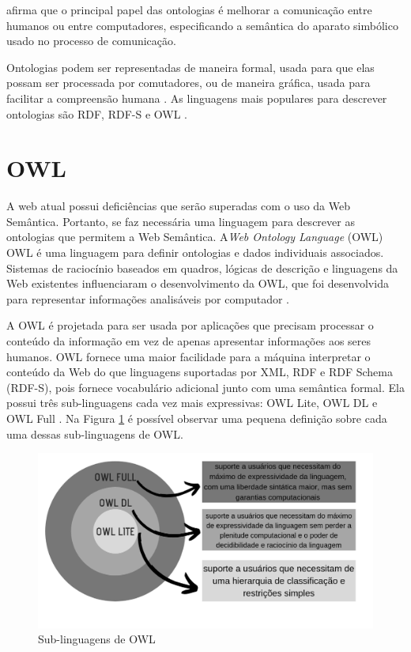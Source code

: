 \documentclass{bcc}
\begin{document}
\cite{lv2011} afirma que o principal papel das ontologias é melhorar a comunicação entre humanos ou entre computadores, especificando a semântica do aparato simbólico usado no processo de comunicação.

Ontologias podem ser representadas de maneira formal, usada para que elas possam ser processada por comutadores, ou de maneira gráfica, usada para facilitar a compreensão humana \cite{isotani2015}. As linguagens mais populares para descrever ontologias são RDF, RDF-S e OWL \cite{mcguinness}.


\section{OWL}

A web atual possui deficiências que serão superadas com o uso da Web Semântica. Portanto, se faz necessária uma linguagem para descrever as ontologias que permitem a Web Semântica. A\textit{Web Ontology Language} (OWL) OWL é uma linguagem para definir ontologias e dados individuais associados. Sistemas de raciocínio baseados em quadros, lógicas de descrição e linguagens da Web existentes influenciaram o desenvolvimento da OWL, que foi desenvolvida para representar informações analisáveis por computador \cite{lacy2005}.

A OWL é projetada para ser usada por aplicações que precisam processar o conteúdo da informação em vez de apenas apresentar informações aos seres humanos. OWL fornece uma maior facilidade para a máquina interpretar o conteúdo da Web do que linguagens suportadas por XML, RDF e RDF Schema (RDF-S), pois fornece vocabulário adicional junto com uma semântica formal. Ela possui três sub-linguagens cada vez mais expressivas: OWL Lite, OWL DL e OWL Full \cite{mcguinness}. Na Figura \ref{fig:owlsub} é possível observar uma pequena definição sobre cada uma dessas sub-linguagens de OWL.

\begin{figure}[H]
\centering
\includegraphics[width=.9\textwidth]{Figuras/owl_sub.png}
\caption{Sub-linguagens de OWL}
\label{fig:owlsub}
\end{figure}
\end{document}
